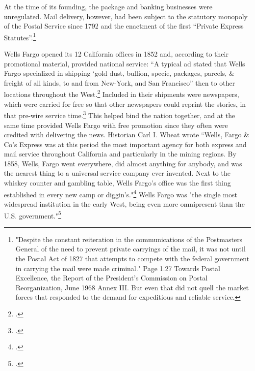 At the time of its founding, the package and banking businesses were unregulated. Mail delivery, however, had been subject to the statutory monopoly of the Postal Service since 1792 and the enactment of the first “Private Express Statutes”.\footnote{"Despite the constant reiteration in the communications of the Postmasters General of the need to prevent private carryings of the mail, it was not until the Postal Act of 1827 that attempts to compete with the federal government in carrying the mail were made criminal." Page 1.27 Towards Postal Excellence, the Report of the President’s Commission on Postal Reorganization, June 1968 Annex III.  But even that did not quell the market forces that responded to the demand for expeditious and reliable service.}

Wells Fargo opened its 12 California offices in 1852 and, according to their promotional material, provided national service: “A typical ad stated that Wells Fargo specialized in shipping ‘gold dust, bullion, specie, packages, parcels, \& freight of all kinds, to and from New-York, and San Francisco” then to other locations throughout the West.\footcite{Stagcoach} Included in their shipments were newspapers, which were carried for free so that other newspapers could reprint the stories, in that pre-wire service time.\footcite{Stagcoach} This helped bind the nation together, and at the same time provided Wells Fargo with free promotion since they often were credited with delivering the news. Historian Carl I. Wheat wrote “Wells, Fargo \& Co’s Express was at this period the most important agency for both express and mail service throughout California and particularly in the mining regions.  By 1858, Wells, Fargo went everywhere, did almost anything for anybody, and was the nearest thing to a universal service company ever invented.  Next to the whiskey counter and gambling table, Wells Fargo’s office was the first thing established in every new camp or diggin’s."\footcite{CLHI}  Wells Fargo was "the single most widespread institution in the early West, being even more omnipresent than the U.S. government."\footcite{PHILPRJ}

